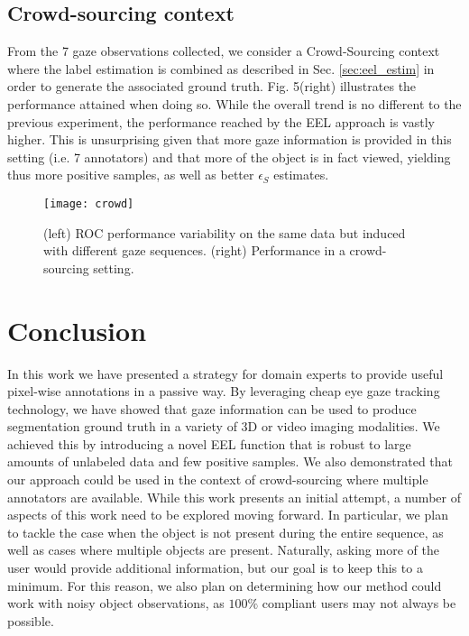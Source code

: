 \subsection{Crowd-sourcing context}
From the 7 gaze observations collected, we consider a Crowd-Sourcing context where the label estimation is combined as described in Sec. \ref{sec:eel_estim} in order to generate the associated ground truth.
Fig. 5(right) illustrates the performance attained when doing so.
While the overall trend is no different to the previous experiment, the performance reached by the EEL approach is vastly higher.
This is unsurprising given that more gaze information is provided in this setting (i.e. 7 annotators) and that more of the object is in fact
viewed, yielding thus more positive samples, as well as better $\epsilon_{S}$ estimates.

\begin{figure}[ht]
\texttt{[image: crowd]}
\caption{(left) ROC performance variability on the same data but induced with different gaze
sequences. (right) Performance in a crowd-sourcing setting.}
\label{fig:eel_crowd}
\end{figure}

\section{Conclusion}
In this work we have presented a strategy for domain experts to provide useful pixel-wise
annotations in a passive way. By leveraging cheap eye gaze tracking technology, we have showed
that gaze information can be used to produce segmentation ground truth in a variety of 3D
or video imaging modalities. We achieved this by introducing a novel EEL function that is
robust to large amounts of unlabeled data and few positive samples. We also demonstrated
that our approach could be used in the context of crowd-sourcing where multiple annotators
are available.
While this work presents an initial attempt, a number of aspects of this work need to
be explored moving forward. In particular, we plan to tackle the case when the object is not
present during the entire sequence, as well as cases where multiple objects are present. Naturally,
asking more of the user would provide additional information, but our goal is to keep this to a
minimum. For this reason, we also plan on determining how our method could work with noisy
object observations, as $100\%$ compliant users may not always be possible.
